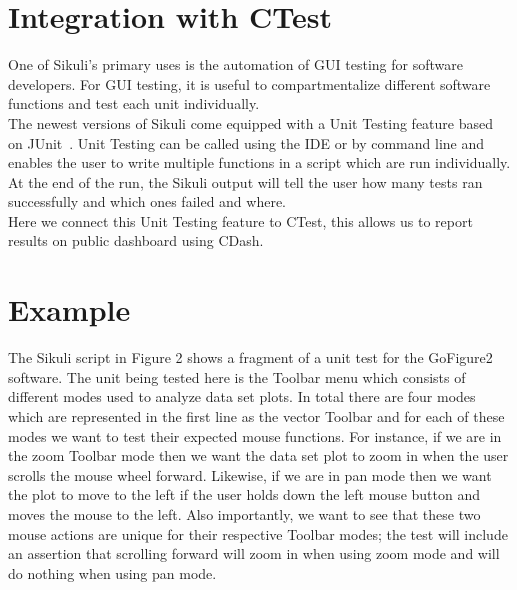 \documentclass{InsightArticle}
\begin{document}
\section{Integration with CTest}

One of Sikuli's primary uses is the automation of GUI testing for software
developers. For GUI testing, it is useful to compartmentalize different software
functions and test each unit individually.\\

The newest versions of Sikuli come equipped with a Unit Testing feature based
on JUnit~\cite{}. Unit Testing can be called using the IDE or by command
line and enables the user to write multiple functions in a script which are
run individually. At the end of the run, the Sikuli output will tell the user
how many tests ran successfully and which ones failed and where.\\

Here we connect this Unit Testing feature to CTest, this allows us to report
results on public dashboard using CDash.


\section{Example}

The Sikuli script in Figure 2 shows a fragment of a unit test for the GoFigure2 software.  The unit being tested here
is the Toolbar menu which consists of different modes used to analyze data set plots.
In total there are four modes which are represented in the first line as the vector Toolbar and for each
of these modes we want to test their expected mouse functions.  For instance, if we are in the zoom Toolbar mode
then we want the data set plot to zoom in when the user scrolls the mouse wheel forward.  Likewise,
if we are in pan mode then we want the plot to move to the left if the user holds down the left mouse button and moves
the mouse to the left.  Also importantly, we want to see that these two mouse actions are unique for their respective Toolbar modes;
the test will include an assertion that scrolling forward will zoom in when using zoom mode and will do nothing when using pan mode.\\
\end{document}
